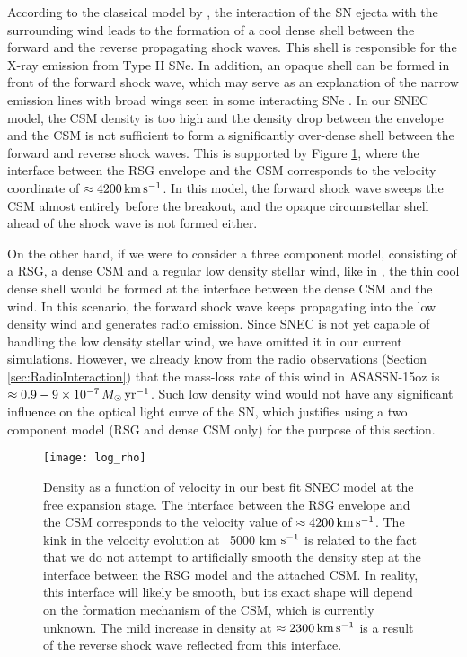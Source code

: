 \documentclass[a4paper,fleqn,usenatbib]{mnras}
\begin{document}
According to the classical model by \citet{1982chevalier}, the interaction of the SN ejecta with the surrounding wind leads to the formation of a cool dense shell between the forward and the reverse propagating shock waves. 
This shell is responsible for the X-ray emission from Type II SNe. 
In addition, an opaque shell can be formed in front of the forward shock wave, which may serve as an explanation of the narrow emission lines with broad wings seen in some interacting SNe \citep{2001chugai}. 
In our SNEC model, the CSM density is too high and the density drop between the envelope and the CSM is not sufficient to form a significantly over-dense shell between the forward and reverse shock waves. 
This is supported by  Figure \ref{fig:CDS}, where the interface between the RSG envelope and the CSM corresponds to the velocity coordinate of $\approx 4200\,{\rm km}\,{\rm s}^{-1}$. 
In this model, the forward shock wave sweeps the CSM almost entirely before the breakout, and the opaque circumstellar shell ahead of the shock wave is not formed either.

On the other hand, if we were to consider a three component model, consisting of a RSG, a dense CSM and a regular low density stellar wind, like in \citet{2018morozova}, the thin cool dense shell would be formed at the interface between the dense CSM and the wind. 
In this scenario, the forward shock wave keeps propagating into the low density wind and generates radio emission. Since SNEC is not yet capable of handling the low density stellar wind, we have omitted it in our current simulations. 
However, we already know from the radio observations (Section \ref{sec:RadioInteraction}) that the mass-loss rate of this wind in ASASSN-15oz is $\approx 0.9-9\times 10^{-7}\,M_{\odot}\,{\rm yr}^{-1}$.
Such low density wind would not have any significant influence on the optical light curve of the SN, which justifies using a two component model (RSG and dense CSM only) for the purpose of this section.
\begin{figure}
\begin{center}
\texttt{[image: log\_rho]} %
\caption{Density as a function of velocity in our best fit SNEC model at the free expansion stage. 
The interface between the RSG envelope and the CSM corresponds to the velocity value of $\approx 4200\,{\rm km}\,{\rm s}^{-1}$. 
The kink in the velocity evolution at ~5000 km $\rm{s^{-1}}$ is related to the fact that we do not attempt to artificially smooth the density step at the interface between the RSG model and the attached CSM. 
In reality, this interface will likely be smooth, but its exact shape will depend on the formation mechanism of the CSM, which is currently unknown.
The mild increase in density at $\approx 2300\,{\rm km}\,{\rm s}^{-1}$ is a result of the reverse shock wave reflected from this interface.}
\label{fig:CDS}
\end{center}
\end{figure}
\end{document}
